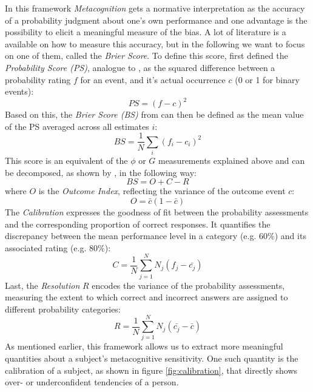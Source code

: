 \documentclass[../main/main.tex]{subfiles}
\begin{document}
	In this framework \textit{Metacognition} gets a normative interpretation as the accuracy of a probability judgment about one's own performance and one advantage is the possibility to elicit a meaningful measure of the bias. A lot of literature is a available on how to measure this accuracy, but in the following we want to focus on one of them, called the \textit{Brier Score}. To define this score, \citep{fleming2014measure} first defined the \textit{Probability Score (PS)}, analogue to \citep{harvey1997confidence}, as the squared difference between a probability rating $f$ for an event, and it's actual occurrence $c$ (0 or 1 for binary events):
	\begin{equation}
			PS = (f - c)^2
	\end{equation}
	Based on this, the \textit{Brier Score (BS)} from \citep{brier1950verification} can then be defined as the mean value of the PS averaged across all estimates $i$:
	\begin{equation}
			BS = \frac{1}{N}\sum_i(f_i - c_i)^2
	\end{equation}
	This score is an equivalent of the $\phi$ or $G$ measurements explained above and can be decomposed, as shown by \citep{murphy1973new}, in the following way:
	\begin{equation}
		BS = O + C - R
	\end{equation}
	where $O$ is the \textit{Outcome Index}, reflecting the variance of the outcome event $c$:
	\begin{equation}
		O = \bar{c}(1-\bar{c})
	\end{equation}
	The \textit{Calibration} expresses the goodness of fit between the probability assessments and the corresponding proportion of correct responses. It quantifies the discrepancy between the mean performance level in a category (e.g. $60\%$) and its associated rating (e.g. $80\%$):
	\begin{equation}
		C = \frac{1}{N}\sum_{j=1}^{N}N_j(f_j - \bar{c_j})
	\end{equation}
	Last, the \textit{Resolution} $R$ encodes the variance of the probability assessments, measuring the extent to which correct and incorrect answers are assigned to different probability categories:
	\begin{equation}
		R = \frac{1}{N}\sum_{j=1}^{N}N_j(\bar{c_j} - \bar{c})
	\end{equation}
	As mentioned earlier, this framework allows us to extract more meaningful quantities about a subject's metacognitive sensitivity. One such quantity is the calibration of a subject, as shown in figure \ref{fig:calibration}, that directly shows over- or underconfident tendencies of a person.
\end{document}
